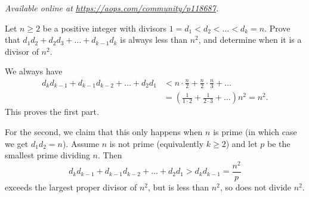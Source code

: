 \textsl{Available online at \url{https://aops.com/community/p118687}.}
\begin{mdframed}[style=mdpurplebox,frametitle={Problem statement}]
Let $n \ge 2$ be a positive integer
with divisors $1 = d_1 < d_2 < \dots < d_k = n$.
Prove that $d_1d_2 + d_2d_3 + \dots + d_{k-1} d_k$ is always less than $n^2$,
and determine when it is a divisor of $n^2$.
\end{mdframed}
We always have
\begin{align*}
  d_k d_{k-1} + d_{k-1} d_{k-2} + \dots + d_2 d_1
  &< n \cdot \frac n2 + \frac n2 \cdot \frac n3 + \dots \\
  &= \left( \frac{1}{1 \cdot 2} + \frac{1}{2 \cdot 3} + \dots \right) n^2 = n^2.
\end{align*}
This proves the first part.

For the second, we claim that this only happens
when $n$ is prime (in which case we get $d_1 d_2 = n$).
Assume $n$ is not prime (equivalently $k \ge 2$)
and let $p$ be the smallest prime dividing $n$.
Then
\[ d_k d_{k-1} + d_{k-1} d_{k-2} + \dots + d_2 d_1
  > d_k d_{k-1} = \frac{n^2}{p} \]
exceeds the largest proper divisor of $n^2$,
but is less than $n^2$, so does not divide $n^2$.
\pagebreak